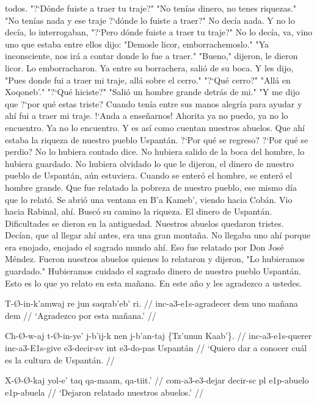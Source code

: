 \documentclass[12pt]{article}
\begin{document}
todos. "?`D\'onde fuiste a traer tu traje?" "No ten\'ias dinero, no tenes riquezas." "No ten\'ias nada y ese traje ?`d\'onde lo fuiste a traer?" No dec\'ia nada. Y no lo dec\'ia, lo interrogaban, "?`Pero d\'onde fuiste a traer tu traje?" No lo dec\'ia, va, vino uno que estaba entre ellos dijo: "Demosle licor, emborrachemoslo." "Ya inconsciente, nos ir\'a a contar donde lo fue a traer." "Bueno," dijeron, le dieron licor. Lo emborracharon. Ya entre su borrachera, sali\'o de su boca. Y les dijo, "Pues donde fui a traer mi traje, all\'a sobre el cerro." "?`Qu\'e cerro?" "All\'a en Xoqoneb'." "?`Qu\'e hiciste?" "Sali\'o un hombre grande detr\'as de mi." "Y me dijo que ?`por qu\'e estas triste? Cuando ten\'ia entre sus manos alegr\'ia para ayudar y ah\'i fui a traer mi traje. !`Anda a ense\~narnos! Ahorita ya no puedo, ya no lo encuentro. Ya no lo encuentro. Y es as\'i como cuentan nuestros abuelos. Que ah\'i estaba la riqueza de nuestro pueblo Uspant\'an. ?`Por qu\'e se regreso? ?`Por qu\'e se perdio? No lo hubiera contado dice. No hubiera salido de la boca del hombre, lo hubiera guardado. No hubiera olvidado lo que le dijeron, el dinero de nuestro pueblo de Uspant\'an, a\'un estuviera. Cuando se enter\'o el hombre, se enter\'o el hombre grande. Que fue relatado la pobreza de nuestro pueblo, ese mismo d\'ia que lo relat\'o. Se abri\'o una ventana en B'a Kameb', viendo hacia Cob\'an. Vio hacia Rabinal, ah\'i. Busc\'o su camino la riqueza. El dinero de Uspant\'an. Dificultades se dieron en la antiguedad. Nuestros abuelos quedaron tristes. Dec\'ian, que al llegar ah\'i antes, era una gran monta\~na. No llegaba uno ah\'i porque era enojado, enojado el sagrado mundo ah\'i. Eso fue relatado por Don Jos\'e M\'endez. Fueron nuestros abuelos quienes lo relataron y dijeron, "Lo hubieramos guardado." Hubieramos cuidado el sagrado dinero de nuestro pueblo Uspant\'an. Esto es lo que yo relato en esta ma\~nana. En este a\~no y les agradezco a ustedes.

\ex
\begingl
  \gla  T-\O-in-k'amwaj re jun saqrab'eb' ri. //
  \glb inc-a3-e1s-agradecer dem uno ma\~nana dem //
  \glft `Agradezco por esta ma\~nana.' //
\endgl
\xe

\ex
\begingl
  \gla  Ch-\O-w-aj t-\O-in-ye' j-b'ij-k nen j-b'an-taj \{Tz'unun Kaab'\}. //
  \glb inc-a3-e1s-querer inc-a3-E1s-give e3-decir-sv int e3-do-pas Uspant\'an //
  \glft `Quiero dar a conocer cu\'al es la cultura de Uspant\'an. //
\endgl
\xe

\ex
\begingl
  \gla  X-\O-\O-kaj yol-e' taq qa-maam, qa-tiit.' //
  \glb com-a3-e3-dejar decir-sc pl e1p-abuelo e1p-abuela //
  \glft `Dejaron relatado nuestros abuelos.' //
\endgl
\xe
\end{document}
